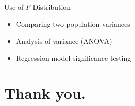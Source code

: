 \documentclass[12pt, aspectratio=169]{beamer}
\begin{document}
    \begin{frame}{Use of \(F\) Distribution}
        \begin{itemize}
            \item Comparing two population variances
            \item Analysis of variance (ANOVA)
            \item Regression model significance testing
        \end{itemize}
    \end{frame}


    \section*{Thank you.}
\end{document}

